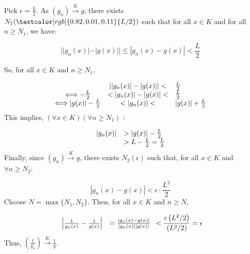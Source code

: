 \documentclass[10pt]{article}
\begin{document}
Pick $\displaystyle \epsilon =\frac{L}{2}$. As $\displaystyle ( g_{n})\xrightarrow{K} g$, there exists $\displaystyle N_{1}(\textcolor[rgb]{0.82,0.01,0.11}{L/2})$ such that for all $\displaystyle x\in K$ and for all $\displaystyle n\geq N_{1}$, we have:


\begin{equation*}
||g_{n}( x) |-|g( x) ||\leq |g_{n}( x) -g( x) |< \frac{L}{2}
\end{equation*}


So, for all $\displaystyle x\in K$ and $\displaystyle n\geq N_{1}$, 


\begin{equation*}
\begin{array}{ c c l }
 & ||g_{n}( x) |-|g( x) ||<  & \frac{L}{2}\\
\Longleftrightarrow -\frac{L}{2} & < |g_{n}( x) |-|g( x) |<  & \frac{L}{2}\\
\Longleftrightarrow |g( x) |-\frac{L}{2} & < |g_{n}( x) |<  & |g( x) |+\frac{L}{2}
\end{array}
\end{equation*}
This implies, $\displaystyle ( \forall x\in K)( \forall n\geq N_{1})$ :


\begin{equation*}
\begin{array}{ c l }
|g_{n}( x) | &  >|g( x) |-\frac{L}{2}\\
 &  >L-\frac{L}{2} =\frac{L}{2}
\end{array}
\end{equation*}
Finally, since $\displaystyle ( g_{n})\xrightarrow{K} g$, there exists $\displaystyle N_{2}( \epsilon )$ such that, for all $\displaystyle x\in K$ and $\displaystyle \forall n\geq N_{2}$: 


\begin{equation*}
|g_{n}( x) -g( x) |< \epsilon \cdot \frac{L^{2}}{2}
\end{equation*}
Choose $\displaystyle N=\max\{N_{1} ,N_{2}\}$. Then, for all $\displaystyle x\in K$ and $\displaystyle n\geq N$,


\begin{equation*}
\begin{array}{ c c }
\left| \frac{1}{g_{n}( x)} -\frac{1}{g( x)}\right|  & =\frac{|g_{n}( x) -g( x) |}{|g_{n}( x) ||g( x) |}
\end{array} < \frac{\epsilon \left( L^{2} /2\right)}{\left( L^{2} /2\right)} =\epsilon 
\end{equation*}
Thus, $\displaystyle \left(\frac{1}{g_{n}}\right)\xrightarrow{K}\frac{1}{g}$.
\end{document}
